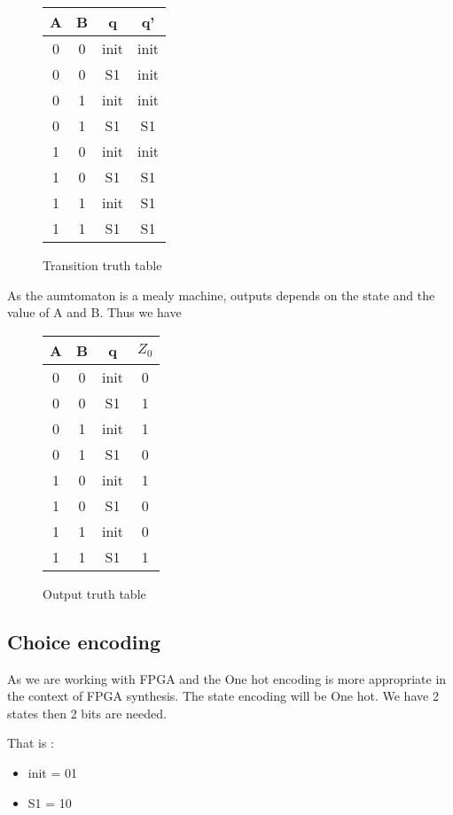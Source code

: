 \documentclass{article}
\begin{document}
\begin{figure}[h]
\centering
\begin{tabular}{c c | c | c}
	
	A & B & q & q' \\
\hline	
	0 & 0 & init & init \\
	0 & 0 & S1 & init \\
	0 & 1 & init & init \\
	0 & 1 & S1 & S1 \\
	1 & 0 & init & init  \\
	1 & 0 & S1 & S1 \\
	1 & 1 & init & S1 \\
	1 & 1 & S1 & S1\\	
 \end{tabular}
\caption{Transition truth table}
\end{figure}

As the aumtomaton is a mealy machine, outputs depends on the state and the value of A and B. Thus we have

\begin{figure}[h]
\centering
\begin{tabular}{c c  c | c}
	
	A & B & q & $Z_0$ \\
\hline	
	0 & 0 & init & 0 \\
	0 & 0 & S1 & 1 \\
	0 & 1 & init & 1 \\
	0 & 1 & S1 & 0 \\
	1 & 0 & init & 1  \\
	1 & 0 & S1 & 0 \\
	1 & 1 & init & 0 \\
	1 & 1 & S1 & 1 \\	
 \end{tabular}
\caption{Output truth table}
\end{figure}

\subsection{Choice encoding}
As we are working with FPGA and the One hot encoding  is more appropriate in
the context of FPGA synthesis. The state encoding will be One hot. We have 2 states then 2 bits are needed.

That is : 
\begin{itemize}
\item init = 01
\item S1 = 10
\end{itemize}
\end{document}

